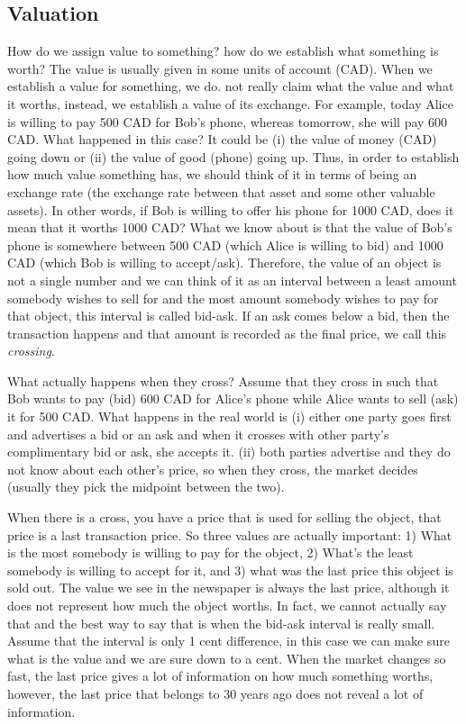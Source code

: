 \subsection{Valuation}

How do we assign value to something? how do we establish what something is worth?
The value is usually given in some units of account (\eg CAD). When we establish a value for something, we do. not really claim what the value and what it worths, instead, we establish a value of its exchange. For example, today Alice is willing to pay 500 CAD for Bob's phone, whereas tomorrow, she will pay 600 CAD. What happened in this case? It could be (i) the value of money (CAD) going down or (ii) the value of good (phone) going up. Thus, in order to establish how much value something has, we should think of it in terms of being an exchange rate (the exchange rate between that asset and some other valuable assets). In other words, if Bob is willing to offer his phone for 1000 CAD, does it mean that it worths 1000 CAD? What we know about is that the value of Bob's phone is somewhere between 500 CAD (which Alice is willing to bid) and 1000 CAD (which Bob is willing to accept/ask). Therefore, the value of an object is not a single number and we can think of it as an interval between a least amount somebody wishes to sell for and the most amount somebody wishes to pay for that object, this interval is called bid-ask. If an ask comes below a bid, then the transaction happens and that amount is recorded as the final price, we call this \textit{crossing}. \par
What actually happens when they cross? Assume that they cross in such that Bob wants to pay (bid) 600 CAD for Alice's phone while Alice wants to sell (ask) it for 500 CAD. What happens in the real world is (i) either one party goes first and advertises a bid or an ask and when it crosses with other party's complimentary bid or ask, she accepts it. (ii) both parties advertise and they do not know about each other's price, so when they cross, the market decides (usually they pick the midpoint between the two). \par
When there is a cross, you have a price that is used for selling the object, that price is a last transaction price. So three values are actually important: 1) What is the most somebody is willing to pay for the object, 2) What's the least somebody is willing to accept for it, and 3) what was the last price this object is sold out. The value we see in the newspaper is always the last price, although it does not represent how much the object worths. In fact, we cannot actually say that and the best way to say that is when the bid-ask interval is really small. Assume that the interval is only 1 cent difference, in this case we can make sure what is the value and we are sure down to a cent. When the market changes so fast, the last price gives a lot of information on how much something worths, however, the last price that belongs to 30 years ago does not reveal a lot of information.

